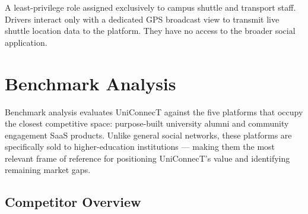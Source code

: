 \documentclass[12pt, a4paper]{article}
\begin{document}
A least-privilege role assigned exclusively to campus shuttle and transport staff.
Drivers interact only with a dedicated GPS broadcast view to transmit live shuttle
location data to the platform. They have no access to the broader social application.

\section{Benchmark Analysis}

Benchmark analysis evaluates UniConnecT against the five platforms that occupy the
closest competitive space: purpose-built university alumni and community engagement
SaaS products. Unlike general social networks, these platforms are specifically sold
to higher-education institutions --- making them the most relevant frame of reference
for positioning UniConnecT's value and identifying remaining market gaps.


\subsection{Competitor Overview}
\end{document}
